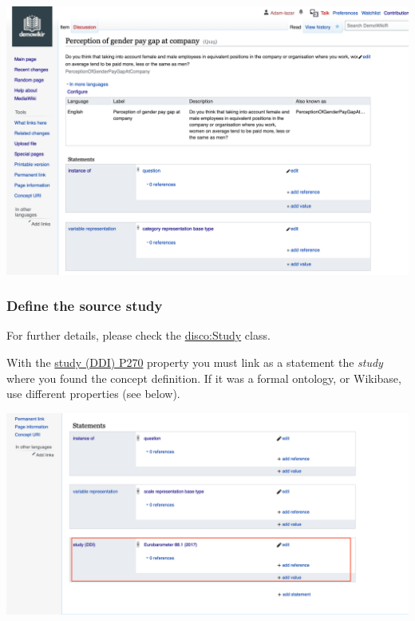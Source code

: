 \documentclass[
  letterpaper,
  DIV=11,
  numbers=noendperiod]{scrreprt}
\begin{document}
\begin{center}
\includegraphics{png/question_to_wikibase/VariableRepresentation_6x4.png}
\end{center}

\subsubsection{Define the source study}\label{define-the-source-study-1}

\begin{tcolorbox}[enhanced jigsaw, opacityback=0, bottomrule=.15mm, rightrule=.15mm, toptitle=1mm, breakable, colbacktitle=quarto-callout-tip-color!10!white, colback=white, title=\textcolor{quarto-callout-tip-color}{\faLightbulb}\hspace{0.5em}{Tip}, leftrule=.75mm, toprule=.15mm, left=2mm, arc=.35mm, colframe=quarto-callout-tip-color-frame, coltitle=black, titlerule=0mm, bottomtitle=1mm, opacitybacktitle=0.6]

For further details, please check the
\href{https://rdf-vocabulary.ddialliance.org/discovery.html\#study}{disco:Study}
class.

\end{tcolorbox}

With the
\href{https://reprexbase.eu/demowiki/index.php?title=Property:P270}{study
(DDI) P270} property you must link as a statement the \emph{study} where
you found the concept definition. If it was a formal ontology, or
Wikibase, use different properties (see below).

\begin{center}
\includegraphics{png/question_to_wikibase/statement_study_2x1.png}
\end{center}
\end{document}
